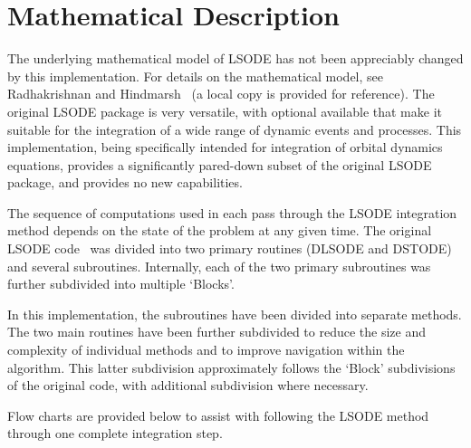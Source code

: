 \section{Mathematical Description}

The underlying mathematical model of LSODE has not been appreciably changed
by this
implementation.  For details on the mathematical model, see Radhakrishnan
and Hindmarsh~\cite{paper:lsode} (a local copy is provided for reference).
The original LSODE package is very versatile, with optional available that
make it suitable for the
integration of a wide range of dynamic events and processes.  This
implementation, being specifically intended for integration of orbital
dynamics equations, provides a significantly pared-down subset of the original
LSODE package, and provides no new capabilities.

The sequence of computations used in each pass through the LSODE integration
method depends on the state of the problem at any given time.  The
original LSODE code~\cite{code:dlsode} was divided into two primary routines
(DLSODE and
DSTODE) and several subroutines.  Internally, each of the two primary
subroutines was further subdivided into multiple `Blocks'.

In this implementation, the subroutines have been divided into separate
methods.  The two main routines have been further subdivided to reduce the
size and complexity of individual methods and to improve navigation
within the algorithm. This latter subdivision approximately follows
the `Block' subdivisions of the original code, with additional subdivision
where necessary.

Flow charts are provided below to assist with following the LSODE method
through one complete integration step.

